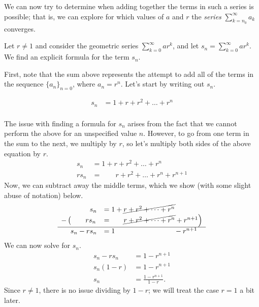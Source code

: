 \documentclass{ximera}
\begin{document}
We can now try to determine when adding together the terms in such a series is possible; that is, we can explore for which values of $a$ and $r$ the \emph{series} $\sum\limits_{k=n_0}^{\infty} a_k$ converges.  

\begin{model}
 Let $r \neq 1$ and consider the geometric series $\sum\limits_{k=0}^\infty a r^k$, and let $s_n = \sum\limits_{k=0}^{\infty} a r^k $.  We find an explicit formula for the term $s_n$.
  
  \begin{explanation}
First, note that the sum above represents the attempt to add all of the terms in the sequence $\{a_n\}_{n=0}$, where $a_n =  r^n$.  Let's start by writing out $s_n$.  

    \begin{align*}
      s_n   &= 1 + r + r^2 + \dots + r^n\\
    \end{align*}

The issue with finding a formula for $s_n$ arises from the fact that we cannot perform the above for an unspecified value $n$.  However, to go from one term in the sum to the next, we multiply by $r$, so let's multiply both sides of the above equation by $r$.
    \begin{align*}
      s_n   &= 1 + r + r^2 + \dots + r^n\\
      r s_n &= ~ \phantom{ 1 + } r + r^2 + \dots + r^n + r^{n+1}
    \end{align*}
Now, we can subtract away the middle terms, which we show (with some slight abuse of notation) below.
 \[     \begin{array}{rl}
      s_n   &= 1 + \cancel{ r + r^2 + \dots + r^n}\\
 -\left(  \phantom{ r^{n+1}} r s_n \right.&=~ \left. \phantom{  1 +  } \cancel{r + r^2 + \dots + r^n} + r^{n+1}\right) \\
 \hline 
     s_n - r s_n &= 1 \phantom{  +  r + r^2 + \dots + r^n } ~ - r^{n+1}\\
    \end{array}
 \]   
 We can now solve for $s_n$.
     \begin{align*}
      s_n - r s_n &= 1 - r^{n+1}\\
      s_n(1-r)    &= 1 - r^{n+1}\\
      s_n &= \frac{1 - r^{n+1}}{1-r}.
    \end{align*}
    Since $r \ne 1$, there is no issue dividing by $1-r$; we will treat the case $r=1$ a bit later.
  \end{explanation}
\end{model}
\end{document}
